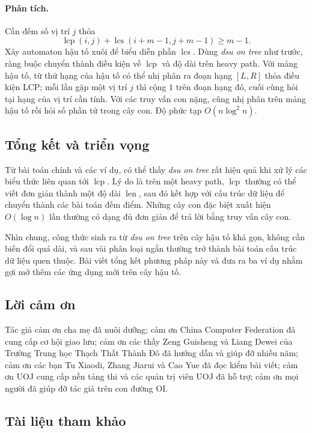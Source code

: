 \documentclass[11pt]{article}
\begin{document}
\paragraph{Phân tích.}
Cần đếm số vị trí $j$ thỏa
\[
  \operatorname{lcp}(i,j)+
  \operatorname{lcs}(i+m-1,j+m-1)\ge m-1.
\]
Xây automaton hậu tố xuôi để biểu diễn phần $\operatorname{lcs}$. Dùng
\emph{dsu on tree} như trước, ràng buộc chuyển thành điều kiện về
\(\operatorname{lcp}\) và độ dài trên heavy path. Với mảng hậu tố, từ thứ hạng
của hậu tố có thể nhị phân ra đoạn hạng $[L,R]$ thỏa điều kiện LCP; mỗi lần gặp
một vị trí $j$ thì cộng $1$ trên đoạn hạng đó, cuối cùng hỏi tại hạng của vị trí
cần tính. Với các truy vấn con nặng, cũng nhị phân trên mảng hậu tố rồi hỏi số
phần tử trong cây con. Độ phức tạp $O(n\log^2 n)$.

\subsection{Tổng kết và triển vọng}

Từ bài toán chính và các ví dụ, có thể thấy \emph{dsu on tree} rất hiệu quả khi
xử lý các biểu thức liên quan tới \(\operatorname{lcp}\). Lý do là trên một
heavy path, \(\operatorname{lcp}\) thường có thể viết đơn giản thành một độ dài
\(\operatorname{len}\), sau đó kết hợp với cấu trúc dữ liệu để chuyển thành các
bài toán đếm điểm. Những cây con đặc biệt xuất hiện $O(\log n)$ lần thường có
dạng đủ đơn giản để trả lời bằng truy vấn cây con.

Nhìn chung, công thức sinh ra từ \emph{dsu on tree} trên cây hậu tố khá gọn,
không cần biến đổi quá dài, và sau vài phân loại ngắn thường trở thành bài toán
cấu trúc dữ liệu quen thuộc. Bài viết tổng kết phương pháp này và đưa ra ba ví
dụ nhằm gợi mở thêm các ứng dụng mới trên cây hậu tố.

\subsection*{Lời cảm ơn}

Tác giả cảm ơn cha mẹ đã nuôi dưỡng; cảm ơn China Computer Federation đã cung
cấp cơ hội giao lưu; cảm ơn các thầy Zeng Guisheng và Liang Dewei của Trường
Trung học Thạch Thất Thành Đô đã hướng dẫn và giúp đỡ nhiều năm; cảm ơn các bạn
Tu Xiaodi, Zhang Jiarui và Cao Yue đã đọc kiểm bài viết; cảm ơn UOJ cung cấp
nền tảng thi và các quản trị viên UOJ đã hỗ trợ; cảm ơn mọi người đã giúp đỡ
tác giả trên con đường OI.

\subsection*{Tài liệu tham khảo}
\end{document}
